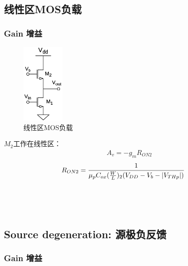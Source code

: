 \documentclass[twoside,a4paper,openright,titlepage,draft]{ctexrep}
\begin{document}
\subsection{线性区MOS负载}
\vspace*{1em}
\subsubsection{Gain 增益}

\begin{figure}
    \centering
    \includegraphics[height=40mm]{currentsourceload.eps}
    \caption{线性区MOS负载}
    \label{fig:线性区MOS负载}
\end{figure}
$M_2$工作在线性区：
\begin{align}
    &A_v = -g_mR_{ON2}
\end{align}
\begin{align}
    &R_{ON2} = \frac{1}{\mu_pC_{ox}(\frac{W}{L})_2(V_{DD} - V_b - \left|V_{THp}\right|)} \notag
\end{align}
\\
\\
\\
\par
\subsection{Source degeneration: 源极负反馈}
\vspace*{1em}
\subsubsection{Gain 增益}
\end{document}
